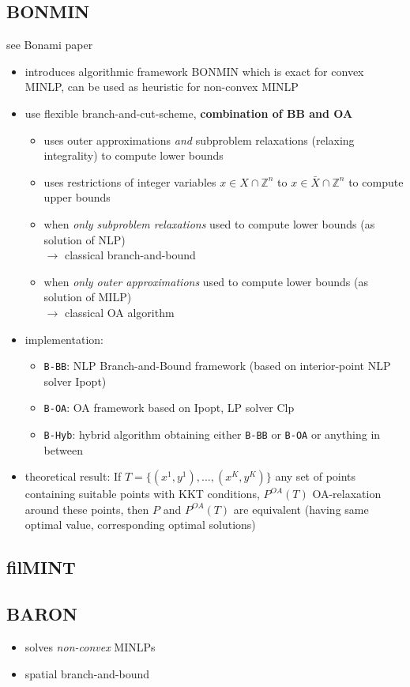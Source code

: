 \documentclass{article}
\begin{document}
\subsection{BONMIN}
see Bonami paper \cite{bonami2008algorithmic}
\begin{itemize}
\item introduces algorithmic framework BONMIN which is exact for convex MINLP, can be used as heuristic for non-convex MINLP
\item use flexible branch-and-cut-scheme, \textbf{combination of BB and OA}
	\begin{itemize}
	\item uses outer approximations \textit{and} subproblem relaxations (relaxing integrality) to compute lower bounds
	\item uses restrictions of integer variables $x\in X \cap \mathbb{Z}^n$ to $x\in \bar{X} \cap \mathbb{Z}^n$ to compute upper bounds
	\item when \emph{only subproblem relaxations} used to compute lower bounds (as solution of NLP) \\
	$\rightarrow$ classical branch-and-bound
	\item when \textit{only outer approximations} used to compute lower bounds (as solution of MILP) \\
	$\rightarrow$ classical OA algorithm
	\end{itemize}
\item implementation:
	\begin{itemize}
	\item \texttt{B-BB}: NLP Branch-and-Bound framework (based on interior-point NLP solver Ipopt)
	\item \texttt{B-OA}: OA framework based on Ipopt, LP solver Clp
	\item \texttt{B-Hyb}: hybrid algorithm obtaining either \texttt{B-BB} or \texttt{B-OA} or anything in between
	\end{itemize}
\item theoretical result: If $T=\{(x^1,y^1), ... ,(x^K,y^K)\}$ any set of points containing suitable points with KKT conditions, $P^{OA}(T)$ OA-relaxation around these points, then $P$ and $P^{OA}(T)$ are equivalent (having same optimal value, corresponding optimal solutions)
\end{itemize}

\subsection{filMINT}
\cite{abhishek2010filmint}

\subsection{BARON}
\begin{itemize}
\item solves \emph{non-convex} MINLPs
\item spatial branch-and-bound
\end{itemize}

{}

\end{document}
